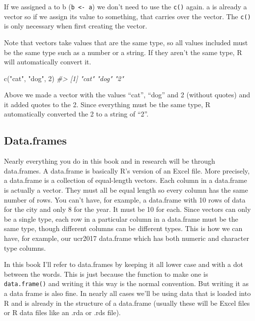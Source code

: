 \documentclass[
]{krantz}
\makeatletter
\newenvironment{Shaded}{\begin{snugshade}}{\end{snugshade}}
\newcommand{\CommentTok}[1]{\textcolor[rgb]{0.37,0.37,0.37}{\textit{#1}}}
\newcommand{\DecValTok}[1]{\textcolor[rgb]{0.06,0.06,0.06}{#1}}
\newcommand{\FunctionTok}[1]{\textcolor[rgb]{0,0,0}{#1}}
\newcommand{\NormalTok}[1]{#1}
\newcommand{\StringTok}[1]{\textcolor[rgb]{0.5,0.5,0.5}{#1}}
\newenvironment{kframe}{%
\medskip{}
\setlength{\fboxsep}{.8em}
 \def\at@end@of@kframe{}%
 \ifinner\ifhmode%
  \def\at@end@of@kframe{\end{minipage}}%
  \begin{minipage}{\columnwidth}%
 \fi\fi%
 \def\FrameCommand##1{\hskip\@totalleftmargin \hskip-\fboxsep
 \colorbox{shadecolor}{##1}\hskip-\fboxsep
     \hskip-\linewidth \hskip-\@totalleftmargin \hskip\columnwidth}%
 \MakeFramed {\advance\hsize-\width
   \@totalleftmargin\z@ \linewidth\hsize
   \@setminipage}}%
 {\par\unskip\endMakeFramed%
 \at@end@of@kframe}
\renewenvironment{Shaded}{\begin{kframe}}{\end{kframe}}
\makeatother
\begin{document}
If we assigned a to b (\texttt{b\ \textless{}-\ a}) we don't need to use the \texttt{c()} again. a is already a vector so if we assign its value to something, that carries over the vector. The \texttt{c()} is only necessary when first creating the vector.

Note that vectors take values that are the same type, so all values included must be the same type such as a number or a string. If they aren't the same type, R will automatically convert it.

\begin{Shaded}
\begin{Highlighting}[]
\FunctionTok{c}\NormalTok{(}\StringTok{"cat"}\NormalTok{, }\StringTok{"dog"}\NormalTok{, }\DecValTok{2}\NormalTok{)}
\CommentTok{\#\textgreater{} [1] "cat" "dog" "2"}
\end{Highlighting}
\end{Shaded}

Above we made a vector with the values ``cat'', ``dog'' and 2 (without quotes) and it added quotes to the 2. Since everything must be the same type, R automatically converted the 2 to a string of ``2''.

\hypertarget{data.frames}{%
\subsection{Data.frames}\label{data.frames}}

Nearly everything you do in this book and in research will be through data.frames. A data.frame is basically R's version of an Excel file. More precisely, a data.frame is a collection of equal-length vectors. Each column in a data.frame is actually a vector. They must all be equal length so every column has the same number of rows. You can't have, for example, a data.frame with 10 rows of data for the city and only 8 for the year. It must be 10 for each. Since vectors can only be a single type, each row in a particular column in a data.frame must be the same type, though different columns can be different types. This is how we can have, for example, our ucr2017 data.frame which has both numeric and character type columns.

In this book I'll refer to data.frames by keeping it all lower case and with a dot between the words. This is just because the function to make one is \texttt{data.frame()} and writing it this way is the normal convention. But writing it as a data frame is also fine. In nearly all cases we'll be using data that is loaded into R and is already in the structure of a data.frame (usually these will be Excel files or R data files like an .rda or .rds file).
\end{document}
